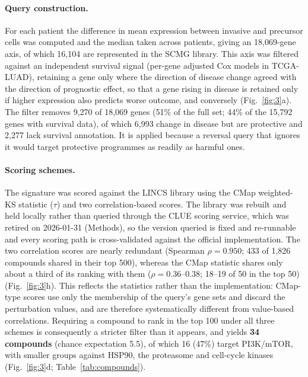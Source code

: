\paragraph{Query construction.} For each patient the difference in mean expression between
invasive and precursor cells was computed and the median taken across patients, giving an
18,069-gene axis, of which 16,104 are represented in the SCMG library. This axis was filtered against an independent survival signal (per-gene
adjusted Cox models in TCGA-LUAD), retaining a gene only where the direction of disease
change agreed with the direction of prognostic effect, so that a gene rising in disease is
retained only if higher expression also predicts worse outcome, and conversely
(Fig.~\ref{fig:3}a). The filter removes 9,270 of 18,069 genes (51\% of the full set; 44\% of
the 15,792 genes with survival data), of which 6,993 change in disease but are protective
and 2,277 lack survival annotation. It is applied because a reversal query that ignores it
would target protective programmes as readily as harmful ones.

\paragraph{Scoring schemes.} The signature was scored against the LINCS library using the
CMap weighted-KS statistic ($\tau$) and two correlation-based scores. The library was rebuilt
and held locally rather than queried through the CLUE scoring service, which was retired on
2026-01-31 (Methods), so the version queried is fixed and re-runnable and every scoring path
is cross-validated against the official implementation. The two correlation scores are
nearly redundant (Spearman $\rho=0.950$; 433 of 1,826 compounds shared in their top 500),
whereas the CMap statistic shares only about a third of its ranking with them
($\rho=0.36$--$0.38$; 18--19 of 50 in the top 50) (Fig.~\ref{fig:3}h). This reflects the
statistics rather than the implementation: CMap-type scores use only the membership of the
query's gene sets and discard the perturbation values, and are therefore systematically
different from value-based correlations. Requiring a compound to rank in the top 100 under
all three schemes is consequently a stricter filter than it appears, and yields
\textbf{34 compounds} (chance expectation 5.5), of which 16 (47\%) target PI3K/mTOR, with
smaller groups against HSP90, the proteasome and cell-cycle kinases (Fig.~\ref{fig:3}d; Table~\ref{tab:compounds}).



